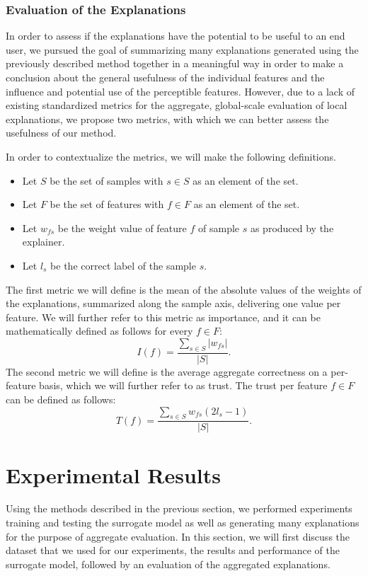 \documentclass{article}
\begin{document}
			\subsubsection{Evaluation of the Explanations}
			In order to assess if the explanations have the potential to be useful to an end
			user, we pursued the goal of summarizing many explanations generated using the
			previously described method together in a meaningful way in order to make a conclusion
			about the general usefulness of the individual features and the influence and
			potential use of the perceptible features. However, due to a lack of existing
			standardized metrics for the aggregate, global-scale evaluation of local explanations,
			we propose two metrics, with which we can better assess the usefulness of our
			method.
			\par
			In order to contextualize the metrics, we will make the following definitions.
			\begin{itemize}
				\item Let \(S\) be the set of samples with \(s \in S\) as an element of the set.
				\item Let \(F\) be the set of features with \(f \in F\) as an element of the set.
				\item Let \(w_{fs}\) be the weight value of feature \(f\) of sample \(s\) as
					produced by the explainer.
				\item Let \(l_{s}\) be the correct label of the sample \(s\).
			\end{itemize}
			The first metric we will define is the mean of the absolute values of the weights of
			the explanations, summarized along the sample axis, delivering one value per feature.
			We will further refer to this metric as importance, and it can be mathematically
			defined as follows for every \(f \in F\):
			\[I(f) = \frac{\sum_{s \in S} |w_{fs}|}{|S|}.\]
			The second metric we will define is the average aggregate correctness on a per-feature
			basis, which we will further refer to as trust. The trust per feature \(f \in F\) can
			be defined as follows:
			\[T(f) = \frac{\sum_{s \in S} w_{fs}(2l_{s}-1)}{|S|}.\]
	\section{Experimental Results}
	\label{sec:experimental_results}
	Using the methods described in the previous section, we performed experiments training and
	testing the surrogate model as well as generating many explanations for the purpose of
	aggregate evaluation. In this section, we will first discuss the dataset that we used for our
	experiments, the results and performance of the surrogate model, followed by an evaluation of
	the aggregated explanations.
\end{document}
